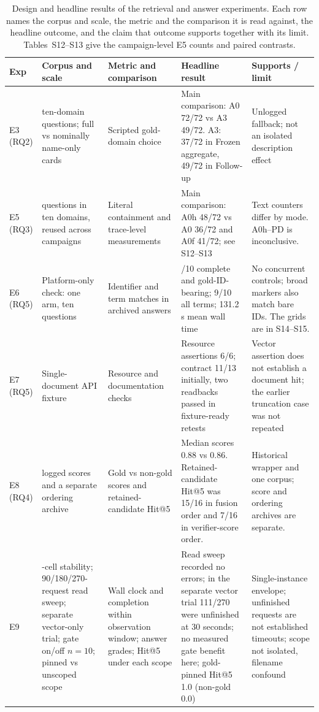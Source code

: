 \documentclass[final,5p,times,twocolumn]{elsarticle}
\begin{document}
\begin{table}[t]
\centering
\footnotesize
\setlength{\tabcolsep}{4pt}
\caption{Design and headline results of the retrieval and answer experiments.
Each row names the corpus and scale, the metric and the comparison it is read
against, the headline outcome, and the claim that outcome supports together
with its limit. Tables~S12--S13 give the campaign-level E5 counts and paired
contrasts.}
\label{tab:retrieval-design}
\begin{tabular}{@{}>{\raggedright\arraybackslash}p{}>{\raggedright\arraybackslash}p{}>{\raggedright\arraybackslash}p{}>{\raggedright\arraybackslash}p{}>{\raggedright\arraybackslash}p{}@{}}
\toprule
Exp & Corpus and scale & Metric and comparison & Headline result & Supports / limit\\
\midrule
E3 (RQ2) & 72 ten-domain questions; full vs nominally name-only cards & Scripted gold-domain choice & Main comparison: A0 72/72 vs A3 49/72. A3: 37/72 in Frozen aggregate, 49/72 in Follow-up & Unlogged fallback; not an isolated description effect\\
E5 (RQ3) & 72 questions in ten domains, reused across campaigns & Literal containment and trace-level measurements & Main comparison: A0h 48/72 vs A0 36/72 and A0f 41/72; see S12--S13 & Text counters differ by mode. A0h--PD is inconclusive.\\
E6 (RQ5) & Platform-only check: one arm, ten questions & Identifier and term matches in archived answers & 10/10 complete and gold-ID-bearing; 9/10 all terms; 131.2 s mean wall time & No concurrent controls; broad markers also match bare IDs. The grids are in S14--S15.\\
E7 (RQ5) & Single-document API fixture & Resource and documentation checks & Resource assertions 6/6; contract 11/13 initially, two readbacks passed in fixture-ready retests & Vector assertion does not establish a document hit; the earlier truncation case was not repeated\\
E8 (RQ4) & 191 logged scores and a separate ordering archive & Gold vs non-gold scores and retained-candidate Hit@5 & Median scores 0.88 vs 0.86. Retained-candidate Hit@5 was 15/16 in fusion order and 7/16 in verifier-score order. & Historical wrapper and one corpus; score and ordering archives are separate.\\
E9 & 27-cell stability; 90/180/270-request read sweep; separate vector-only trial; gate on/off $n=10$; pinned vs unscoped scope & Wall clock and completion within observation window; answer grades; Hit@5 under each scope & Read sweep recorded no errors; in the separate vector trial 111/270 were unfinished at 30 seconds; no measured gate benefit here; gold-pinned Hit@5 1.0 (non-gold 0.0) & Single-instance envelope; unfinished requests are not established timeouts; scope not isolated, filename confound\\
\bottomrule
\end{tabular}
\end{table}
\end{document}
